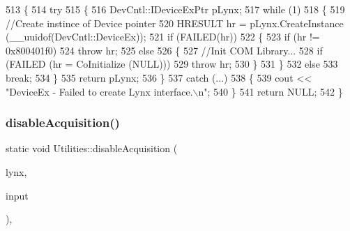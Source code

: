 \begin{DoxyCode}
513     \{
514         \textcolor{keywordflow}{try}
515         \{
516             DevCntl::IDeviceExPtr pLynx;
517             \textcolor{keywordflow}{while} (1)
518             \{
519                 \textcolor{comment}{//Create instince of Device pointer}
520                 HRESULT hr = pLynx.CreateInstance (\_\_uuidof(DevCntl::DeviceEx));
521                 \textcolor{keywordflow}{if} (FAILED(hr))
522                 \{
523                     \textcolor{keywordflow}{if} (hr != 0x800401f0)
524                         \textcolor{keywordflow}{throw} hr;
525                     \textcolor{keywordflow}{else}
526                     \{
527                         \textcolor{comment}{//Init COM Library...}
528                         \textcolor{keywordflow}{if} (FAILED (hr = CoInitialize (NULL)))
529                             \textcolor{keywordflow}{throw} hr;
530                     \}
531                 \}
532                 \textcolor{keywordflow}{else}
533                     \textcolor{keywordflow}{break};
534             \}
535             \textcolor{keywordflow}{return} pLynx;
536         \}
537         \textcolor{keywordflow}{catch} (...)
538         \{
539             cout << \textcolor{stringliteral}{"DeviceEx - Failed to create Lynx interface.\(\backslash\)n"};
540         \}
541         \textcolor{keywordflow}{return} NULL;
542     \}
\end{DoxyCode}
\mbox{\label{class_utilities_a1f36dd943490f7df78b01b83056e49c6_a1f36dd943490f7df78b01b83056e49c6}} 
\subsubsection{\texorpdfstring{disable\+Acquisition()}{disableAcquisition()}\hspace{0.1cm}{\footnotesize\ttfamily [1/2]}}
{\footnotesize\ttfamily static void Utilities\+::disable\+Acquisition (\begin{DoxyParamCaption}\item[{Dev\+Cntl\+::\+I\+Device\+Ptr \&}]{lynx,  }\item[{L\+O\+NG}]{input }\end{DoxyParamCaption})\hspace{0.3cm}{\ttfamily [inline]}, {\ttfamily [static]}}

